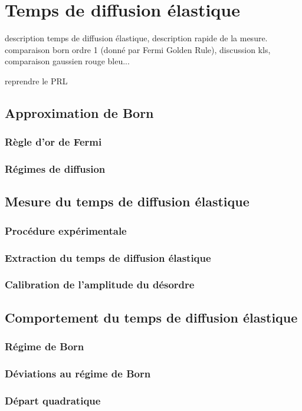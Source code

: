 \chapter{Temps de diffusion élastique}

description temps de diffusion élastique, description rapide de la mesure. comparaison born ordre 1 (donné par Fermi Golden Rule), discussion kls, comparaison gaussien rouge bleu...


reprendre le PRL

\section{Approximation de Born}
\subsection{Règle d'or de Fermi}
\subsection{Régimes de diffusion}

\section{Mesure du temps de diffusion élastique}
\subsection{Procédure expérimentale}
\subsection{Extraction du temps de diffusion élastique}
\subsection{Calibration de l'amplitude du désordre}

\section{Comportement du temps de diffusion élastique}
\subsection{Régime de Born}
\subsection{Déviations au régime de Born}
\subsection{Départ quadratique}